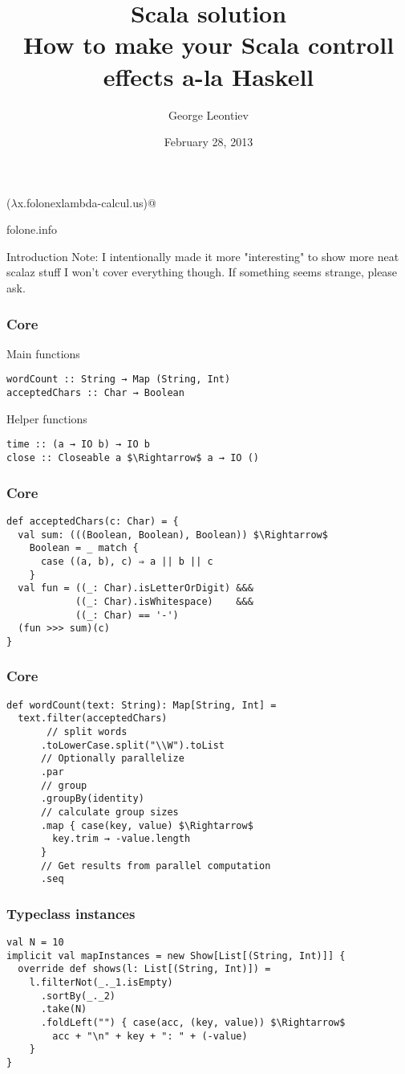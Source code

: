 \documentclass{beamer}
\title[Scala solution]{Scala solution\\How to make your Scala controll effects a-la Haskell}
\author{George Leontiev}
\institute{deltamethod GmbH}
\date{February 28, 2013}
\begin{document}
\begin{frame}
\titlepage
\centerline{($\lambda$x.folonexlambda-calcul.us)@}
\centerline{folone.info}
\end{frame}


\begin{frame}{Introduction}
  Note: I intentionally made it more "interesting" to show more neat scalaz stuff\newline
  I won't cover everything though. If something seems strange, please ask.
\end{frame}

\begin{frame}[fragile]
\frametitle{Core}
Main functions
\begin{lstlisting}[mathescape]
wordCount :: String → Map (String, Int)
acceptedChars :: Char → Boolean
\end{lstlisting}
Helper functions
\begin{lstlisting}[mathescape]
time :: (a → IO b) → IO b
close :: Closeable a $\Rightarrow$ a → IO ()
\end{lstlisting}
\end{frame}

\begin{frame}[fragile]
\frametitle{Core}
\begin{lstlisting}[mathescape]
def acceptedChars(c: Char) = {
  val sum: (((Boolean, Boolean), Boolean)) $\Rightarrow$
    Boolean = _ match {
      case ((a, b), c) ⇒ a || b || c
    }
  val fun = ((_: Char).isLetterOrDigit) &&&
            ((_: Char).isWhitespace)    &&&
            ((_: Char) == '-')
  (fun >>> sum)(c)
}
\end{lstlisting}
\end{frame}

\begin{frame}[fragile]
\frametitle{Core}
\begin{lstlisting}[mathescape]
def wordCount(text: String): Map[String, Int] =
  text.filter(acceptedChars)
       // split words
      .toLowerCase.split("\\W").toList
      // Optionally parallelize
      .par
      // group
      .groupBy(identity)
      // calculate group sizes
      .map { case(key, value) $\Rightarrow$
        key.trim → -value.length
      }
      // Get results from parallel computation
      .seq
\end{lstlisting}
\end{frame}

\begin{frame}[fragile]
\frametitle{Typeclass instances}
\begin{lstlisting}[mathescape]
val N = 10
implicit val mapInstances = new Show[List[(String, Int)]] {
  override def shows(l: List[(String, Int)]) =
    l.filterNot(_._1.isEmpty)
      .sortBy(_._2)
      .take(N)
      .foldLeft("") { case(acc, (key, value)) $\Rightarrow$
        acc + "\n" + key + ": " + (-value)
    }
}
\end{lstlisting}
\end{frame}
\end{document}

